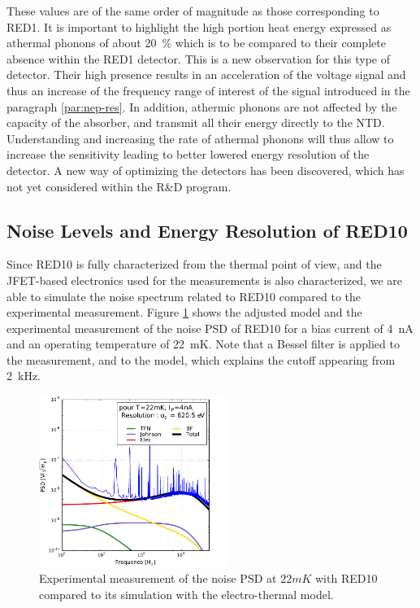 These values are of the same order of magnitude as those corresponding to RED1. It is important to highlight the high portion heat energy expressed as athermal phonons of about \SI{20}{\percent} which is to be compared to their complete absence within the RED1 detector. This is a new observation for this type of detector. Their high presence results in an acceleration of the voltage signal and thus an increase of the frequency range of interest of the signal introduced in the paragraph \ref{par:nep-res}. In addition, athermic phonons are not affected by the capacity of the absorber, and transmit all their energy directly to the NTD. Understanding and increasing the rate of athermal phonons will thus allow to increase the sensitivity leading to better lowered energy resolution of the detector. A new way of optimizing the detectors has been discovered, which has not yet considered within the R\&D program.


\subsection{Noise Levels and Energy Resolution of RED10}

Since RED10 is fully characterized from the thermal point of view, and the JFET-based electronics used for the measurements is also characterized, we are able to simulate the noise spectrum related to RED10 compared to the experimental measurement. Figure \ref{fig:noise-red10} shows the adjusted model and the experimental measurement of the noise PSD of RED10 for a bias current of \SI{4}{\nano\ampere} and an operating temperature of \SI{22}{\milli\kelvin}. Note that a Bessel filter is applied to the measurement, and to the model, which explains the cutoff appearing from \SI{2}{\kilo\Hz}.

\begin{figure}
\begin{center}
\includegraphics[width=0.55\textwidth]{Figures/Ethem/modexp.pdf}
\end{center}
\caption{Experimental measurement of the noise PSD at $22 mK$ with RED10 compared to its simulation with the electro-thermal model.}
\label{fig:noise-red10}
\end{figure}

